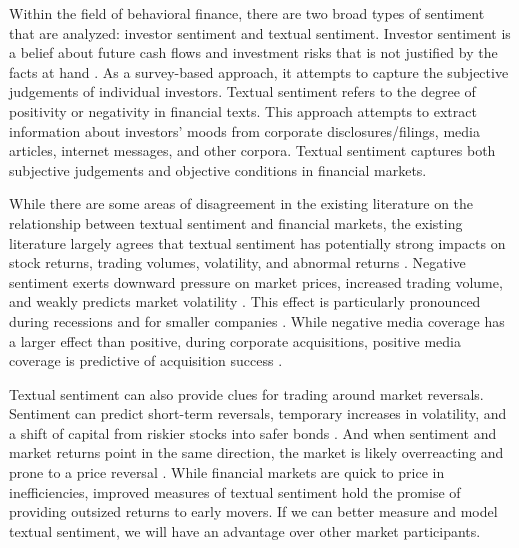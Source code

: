 
Within the field of behavioral finance, there are two broad types of sentiment that are analyzed: investor sentiment and textual sentiment. Investor sentiment is a belief about future cash flows and investment risks that is not justified by the facts at hand \citep{BakerMalcolm2007ISit}. As a survey-based approach, it attempts to capture the subjective judgements of individual investors. Textual sentiment refers to the degree of positivity or negativity in financial texts. This approach attempts to extract information about investors’ moods from corporate disclosures/filings, media articles, internet messages, and other corpora. Textual sentiment captures both subjective judgements and objective conditions in financial markets.



While there are some areas of disagreement in the existing literature on the relationship between textual sentiment and financial markets, the existing literature largely agrees that textual sentiment has potentially strong impacts on stock returns, trading volumes, volatility, and abnormal returns \citep{KearneyColm2014Tsif}. Negative sentiment exerts downward pressure on market prices, increased trading volume, and weakly predicts market volatility \citep{TetlockPaul2007GCtI}. This effect is particularly pronounced during recessions \citep{garciadiego2013SdR} and for smaller companies \citep{FergusonNickyJ2015MCaS}. While negative media coverage has a larger effect than positive, during corporate acquisitions, positive media coverage is predictive of acquisition success \citep{buehlmaier2015role}.

Textual sentiment can also provide clues for trading around market reversals. Sentiment can predict short-term reversals, temporary increases in volatility, and a shift of capital from riskier stocks into safer bonds \citep{DaZhi2015TSoA}. And when sentiment and market returns point in the same direction, the market is likely overreacting and prone to a price reversal \citep{froot2017media}. While financial markets are quick to price in inefficiencies, improved measures of textual sentiment hold the promise of providing outsized returns to early movers. If we can better measure and model textual sentiment, we will have an advantage over other market participants.


